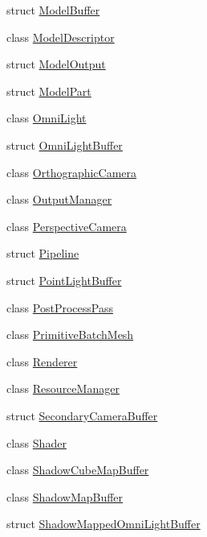 \begin{DoxyCompactItemize}
\item 
struct \mbox{\hyperlink{structmage_1_1rendering_1_1_model_buffer}{Model\+Buffer}}
\item 
class \mbox{\hyperlink{classmage_1_1rendering_1_1_model_descriptor}{Model\+Descriptor}}
\item 
struct \mbox{\hyperlink{structmage_1_1rendering_1_1_model_output}{Model\+Output}}
\item 
struct \mbox{\hyperlink{structmage_1_1rendering_1_1_model_part}{Model\+Part}}
\item 
class \mbox{\hyperlink{classmage_1_1rendering_1_1_omni_light}{Omni\+Light}}
\item 
struct \mbox{\hyperlink{structmage_1_1rendering_1_1_omni_light_buffer}{Omni\+Light\+Buffer}}
\item 
class \mbox{\hyperlink{classmage_1_1rendering_1_1_orthographic_camera}{Orthographic\+Camera}}
\item 
class \mbox{\hyperlink{classmage_1_1rendering_1_1_output_manager}{Output\+Manager}}
\item 
class \mbox{\hyperlink{classmage_1_1rendering_1_1_perspective_camera}{Perspective\+Camera}}
\item 
struct \mbox{\hyperlink{structmage_1_1rendering_1_1_pipeline}{Pipeline}}
\item 
struct \mbox{\hyperlink{structmage_1_1rendering_1_1_point_light_buffer}{Point\+Light\+Buffer}}
\item 
class \mbox{\hyperlink{classmage_1_1rendering_1_1_post_process_pass}{Post\+Process\+Pass}}
\item 
class \mbox{\hyperlink{classmage_1_1rendering_1_1_primitive_batch_mesh}{Primitive\+Batch\+Mesh}}
\item 
class \mbox{\hyperlink{classmage_1_1rendering_1_1_renderer}{Renderer}}
\item 
class \mbox{\hyperlink{classmage_1_1rendering_1_1_resource_manager}{Resource\+Manager}}
\item 
struct \mbox{\hyperlink{structmage_1_1rendering_1_1_secondary_camera_buffer}{Secondary\+Camera\+Buffer}}
\item 
class \mbox{\hyperlink{classmage_1_1rendering_1_1_shader}{Shader}}
\item 
class \mbox{\hyperlink{classmage_1_1rendering_1_1_shadow_cube_map_buffer}{Shadow\+Cube\+Map\+Buffer}}
\item 
class \mbox{\hyperlink{classmage_1_1rendering_1_1_shadow_map_buffer}{Shadow\+Map\+Buffer}}
\item 
struct \mbox{\hyperlink{structmage_1_1rendering_1_1_shadow_mapped_omni_light_buffer}{Shadow\+Mapped\+Omni\+Light\+Buffer}}

\end{DoxyCompactItemize}
